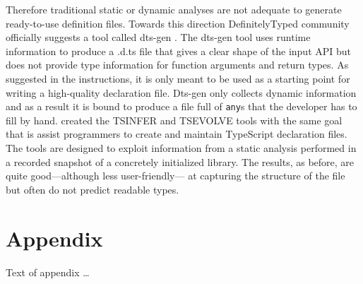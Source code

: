 \documentclass[sigplan,10pt,review,anonymous]{acmart}
\theoremstyle{plain}
\theoremstyle{remark}
\theoremstyle{definition}
\begin{document}
Therefore traditional static or dynamic analyses are not adequate to generate
ready-to-use definition files. Towards this direction DefinitelyTyped
community officially suggests a tool called dts-gen \citep{dtsgen}. The
dts-gen tool uses runtime information to produce a .d.ts file that gives a
clear shape of the input API but does not provide type information for
function arguments and return types. As
suggested in the instructions, it is only meant to be used as a starting
point for writing a high-quality declaration file. Dts-gen only collects
dynamic information and as a result it is bound to produce a file full of
\texttt{any}s that the developer has to fill by hand. \citet{tstools2017}
created the TSINFER and TSEVOLVE tools with the same goal that is assist
programmers to create and maintain TypeScript declaration files. The tools are
designed to exploit information from a static analysis performed in a
recorded snapshot of a concretely initialized library. The results, as
before, are quite good---although less user-friendly--- at capturing the
structure of the file but often do not predict readable types. 









\appendix
\section{Appendix}

Text of appendix \ldots
\end{document}
